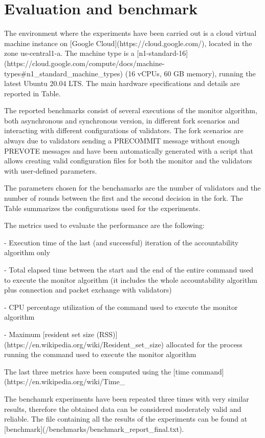 \documentclass[a4paper,11pt,oneside]{report}
\begin{document}
\chapter{Evaluation and benchmark}

\begin{markdown}

The environment where the experiments have been carried out is a cloud virtual machine instance on [Google Cloud](https://cloud.google.com/), located in the zone us-central1-a. 
The machine type is a [n1-standard-16](https://cloud.google.com/compute/docs/machine-types#n1_standard_machine_types) (16 vCPUs, 60 GB memory), running the latest Ubuntu 20.04 LTS. The main hardware specifications and details are reported in Table.

The reported benchmarks consist of several executions of the monitor algorithm, both asynchronous and synchronous version, in different fork scenarios and interacting with different configurations of validators.
The fork scenarios are always due to validators sending a PRECOMMIT message without enough PREVOTE messages and have been automatically generated with a script that allows creating valid configuration files for both the monitor and the validators with user-defined parameters.

The parameters chosen for the benchamarks are the number of validators and the number of rounds between the first and the second decision in the fork. 
The Table summarizes the configurations used for the experiments.

The metrics used to evaluate the performance are the following:

- Execution time of the last (and successful) iteration of the accountability algorithm only

- Total elapsed time between the start and the end of the entire command used to execute the monitor algorithm (it includes the whole accountability algorithm plus connection and packet exchange with validators)

- CPU percentage utilization of the command used to execute the monitor algorithm

- Maximum [resident set size (RSS)](https://en.wikipedia.org/wiki/Resident_set_size) allocated for the process running the command used to execute the monitor algorithm

The last three metrics have been computed using the [time command](https://en.wikipedia.org/wiki/Time_%

The benchamrk experiments have been repeated three times with very similar results, therefore the obtained data can be considered moderately valid and reliable.
The file containing all the results of the experiments can be found at [benchmark](/benchmarks/benchmark_report_final.txt). 

\end{markdown}
\end{document}
